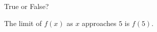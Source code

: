 \documentclass{ximera}
\author{Gregory Hartman \and Matthew Carr}
\begin{document}
\begin{exercise}



True or False? 
\begin{center}
The limit of $f(x)$ as $x$ approaches $5$ is $f\left({5}\right)$.
\end{center}
\begin{prompt}
\begin{multipleChoice}
\end{multipleChoice}
\end{prompt}

\end{exercise}
\end{document}
